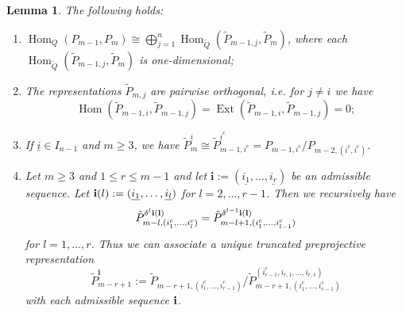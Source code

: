 \documentclass{amsart}
\newtheorem{lemma}[theorem]{Lemma}
\newcommand{\ui}{\underline i}
\newcommand{\Ext}{\operatorname{Ext}}
\newcommand{\Hom}{\operatorname{Hom}}
\begin{document}
\begin{lemma}The following holds:
  \label{le:preprojective lifts}
  \begin{enumerate}
    \item $\Hom_Q(P_{m-1},P_m)\cong\bigoplus_{j=1}^n \Hom_{\tilde Q}(\tilde P_{m-1,j},\tilde P_m)$, where each $\Hom_{\tilde Q}(\tilde P_{m-1,j},\tilde P_m)$ is one-dimensional;
    \item The representations $\tilde P_{m,j}$ are pairwise orthogonal, i.e. for $j\neq i$ we have $$\Hom(\tilde P_{m-1,i},\tilde P_{m-1,j})=\Ext(\tilde P_{m-1,i},\tilde P_{m-1,j})=0;$$
    \item If $\ui\in I_{n-1}$ and $m\geq 3$, we have $\tilde P_{m}^{\ui}\cong \tilde P_{m-1,i^c}^{\ui^c}= P_{m-1,i^c}/P_{m-2,(i^c,i^c)}$.
		\item Let $m\geq 3$ and $1\leq r\leq m-1$ and let $\mathbf i:=(\underline{i_1},\ldots,\underline{i_r})$ be an admissible sequence. Let ${\bf i}(l):=(\underline{i_1},\ldots,\underline{i_l})$ for $l=2,\ldots,r-1$. Then we recursively have
		\[\tilde P_{m-l,(i_1^c,\ldots,i_l^c)}^{\delta^l{\bf i(l)}}=\tilde P_{m-l+1,(i_1^c,\ldots,i_{l-1}^c)}^{\delta^{l-1}\bf i(l)}\]
		for $l=1,\ldots,r$. Thus we can associate a unique truncated preprojective representation $$\tilde P^{\mathbf i}_{m-r+1}:=\tilde P_{m-r+1,(i_1^c,\ldots,i_{r-1}^c)}/\tilde P_{m-r+1,(i_1^c,\ldots,i_{r-1}^c)}^{(i_{r-1}^c,i_{r,1},\ldots,i_{r,s})}$$ with each admissible sequence ${\bf i}$.
  \end{enumerate}
\end{lemma}
\end{document}
